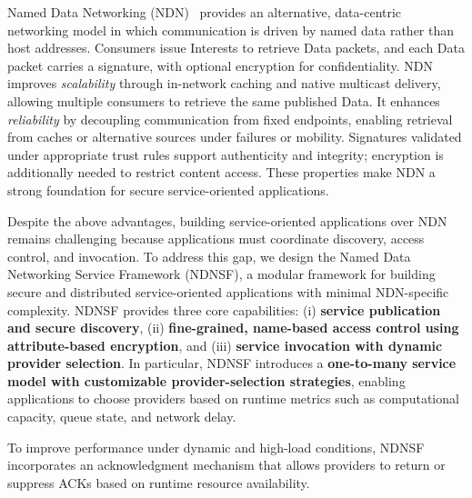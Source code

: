 Named Data Networking (NDN)~\cite{zhang2014named} provides an alternative, data-centric networking model in which communication is driven by named data rather than host addresses. Consumers issue Interests to retrieve Data packets, and each Data packet carries a signature, with optional encryption for confidentiality. NDN improves \emph{scalability} through in-network caching and native multicast delivery, allowing multiple consumers to retrieve the same published Data. It enhances \emph{reliability} by decoupling communication from fixed endpoints, enabling retrieval from caches or alternative sources under failures or mobility. Signatures validated under appropriate trust rules support authenticity and integrity; encryption is additionally needed to restrict content access. These properties make NDN a strong foundation for secure service-oriented applications.

Despite the above advantages, building service-oriented applications over NDN remains challenging because applications must coordinate discovery, access control, and invocation. To address this gap, we design the Named Data Networking Service Framework (NDNSF), a modular framework for building secure and distributed service-oriented applications with minimal NDN-specific complexity. NDNSF provides three core capabilities: (i) \textbf{service publication and secure discovery}, (ii) \textbf{fine-grained, name-based access control using attribute-based encryption}, and (iii) \textbf{service invocation with dynamic provider selection}. In particular, NDNSF introduces a \textbf{one-to-many service model with customizable provider-selection strategies}, enabling applications to choose providers based on runtime metrics such as computational capacity, queue state, and network delay.

To improve performance under dynamic and high-load conditions, NDNSF incorporates an acknowledgment mechanism that allows providers to return or suppress ACKs based on runtime resource availability.

